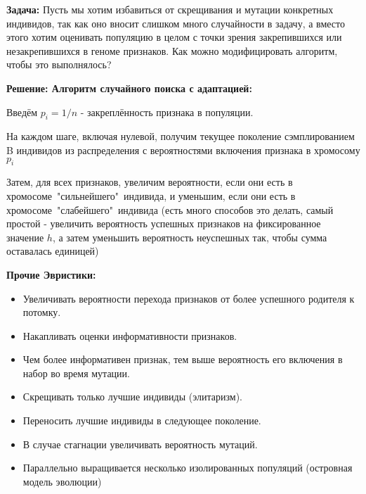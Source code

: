 \textbf{Задача:} Пусть мы хотим избавиться от скрещивания и мутации конкретных индивидов, так как оно вносит слишком много случайности в задачу, а вместо этого хотим оценивать популяцию в целом с точки зрения закрепившихся или незакрепившихся в геноме признаков. 
Как можно модифицировать алгоритм, чтобы это выполнялось?

\textbf{Решение: Алгоритм случайного поиска с адаптацией:}

Введём $p_i = 1/n$ - закреплённость признака в популяции.

На каждом шаге, включая нулевой, получим текущее поколение сэмплированием B индивидов из распределения с вероятностями включения признака в хромосому $p_i$

Затем, для всех признаков, увеличим вероятности, если они есть в хромосоме\ "сильнейшего"\ индивида, и уменьшим, если они есть в хромосоме\ "слабейшего"\ индивида 
(есть много способов это делать, самый простой - увеличить вероятность успешных признаков на фиксированное значение $h$, а затем уменьшить вероятность неуспешных так, чтобы сумма оставалась единицей)

\textbf{Прочие Эвристики:}\begin{itemize}
\item Увеличивать вероятности перехода признаков от более успешного родителя к потомку.
\item Накапливать оценки информативности признаков.
\item Чем более информативен признак, тем выше вероятность его включения в набор во время мутации.
\item Скрещивать только лучшие индивиды (элитаризм).
\item Переносить лучшие индивиды в следующее поколение.
\item В случае стагнации увеличивать вероятность мутаций.
\item Параллельно выращивается несколько изолированных популяций (островная модель эволюции)
\end{itemize}

